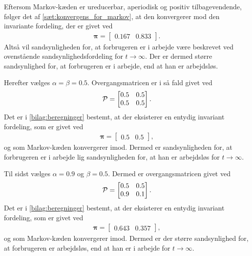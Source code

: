 Eftersom Markov-kæden er ureducerbar, aperiodisk og positiv tilbagevendende, følger det af \autoref{sæt:konvergens_for_markov}, at den konvergerer mod den invariante fordeling, der er givet ved 
\begin{align}\label{eq:pi_p,q}
    \bm \pi = \begin{bmatrix} 0.167 & 0.833\end{bmatrix}.
\end{align}
Altså vil sandsynligheden for, at forbrugeren er i arbejde være beskrevet ved ovenstående sandsynlighedsfordeling for $t \to \infty$. Der er dermed større sandsynlighed for, at forbrugeren er i arbejde, end at han er arbejdsløs. 


Herefter vælges $\alpha = \beta = 0.5$. Overgangsmatricen er i så fald givet ved
\begin{align*}
    \P=\begin{bmatrix}0.5 & 0.5\\ 0.5 & 0.5\end{bmatrix}.
\end{align*}
Det er i \autoref{bilag:beregninger} bestemt, at der eksisterer en entydig invariant fordeling, som er givet ved 
\begin{align*}
    \bm \pi =\begin{bmatrix}0.5 & 0.5\end{bmatrix},
\end{align*}
og som Markov-kæden konvergerer imod. Dermed er sandsynligheden for, at forbrugeren er i arbejde lig sandsynligheden for, at han er arbejdsløs for $t \to \infty$. 

Til sidst vælges $\alpha=0.9$ og $\beta=0.5$. Dermed er overgangsmatricen givet ved
\begin{align*}
    \P=\begin{bmatrix}0.5 & 0.5\\ 0.9 & 0.1\end{bmatrix}.
\end{align*}
Det er i \autoref{bilag:beregninger} bestemt, at der eksisterer en entydig invariant fordeling, som er givet ved
\begin{align*}
    \bm \pi =\begin{bmatrix}0.643 & 0.357\end{bmatrix},
\end{align*}
og som Markov-kæden konvergerer imod. Dermed er der større sandsynlighed for, at forbrugeren er arbejdsløs, end at han er i arbejde for $t \to \infty$.

